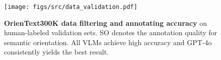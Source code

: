\begin{figure}[t!]
  \begin{center}
  \texttt{[image: figs/src/data\_validation.pdf]}
  \vspace{-15pt}
  \caption{\textbf{OrienText300K data filtering and annotating accuracy} on human-labeled validation sets. SO denotes the annotation quality for semantic orientation.
  All VLMs achieve high accuracy and GPT-4o consistently yields the best result.
  } \label{fig:data_val}
  \end{center}
  \vspace{-10pt}
\end{figure}
